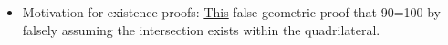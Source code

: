 \documentclass[12pt]{amsart}
\theoremstyle{definition}
\begin{document}
\begin{itemize}
    \item Motivation for existence proofs:
        \href{https://www.youtube.com/watch?v=2Ub7cYtH-aw}{This} false
        geometric proof that 90=100 by falsely assuming the intersection
    exists within the quadrilateral.
\end{itemize}
\end{document}
